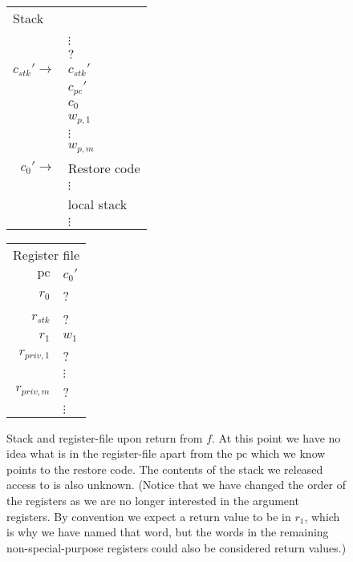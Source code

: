 \documentclass[a4paper]{article}
\newcommand{\var}[1]{\mathit{#1}}
\newcommand{\pc}{\mathit{pc}}
\newcommand{\pcreg}{\mathrm{pc}}
\begin{document}
\begin{figure}
  \label{fig:stack-upon-return}
  \centering
  \begin{tabular}[!h]{r | >{\raggedright\arraybackslash}p{3cm} |}
    \multicolumn{2}{l}{Stack} \\
    \cline{2-2}
 & \\
 & $\vdots$\\
    \cline{2-2} 
 & $?$\\
    \cline{2-2} 
    $c_{\var{stk}}' \rightarrow$  & $c_{\var{stk}}'$ \\
    \cline{2-2}
 & $c_\pc'$ \\
    \cline{2-2}
 & $c_0$ \\
    \cline{2-2}
 & $w_{p,1}$ \\
    \cline{2-2}
 & $\vdots$ \\
    \cline{2-2}
 & $w_{p,m}$ \\
    \cline{2-2}
    $c_0' \rightarrow$   & Restore code \\
 & $\vdots$\\
    \cline{2-2}
 & local stack\\
 & $\vdots$\\
    \cline{2-2}
  \end{tabular}
  \hspace{1cm}
  \begin{tabular}{r | >{\centering\arraybackslash}p{0.75cm} |}
    \multicolumn{2}{r}{Register file} \\
    \cline{2-2}
    $\pcreg$ & $c_0'$\\
    \cline{2-2}
    $r_0$  &  ? \\
    \cline{2-2}
    $r_{\var{stk}}$  & ? \\
    \cline{2-2}
    $r_1$ & $w_1$ \\
    \cline{2-2}
    $r_{\var{priv},1}$ & ?\\
    \cline{2-2}
             & $\vdots$ \\
    \cline{2-2}
    $r_{\var{priv},m}$ & ? \\
    \cline{2-2}
             & $\vdots$ \\
    \cline{2-2}
  \end{tabular}
  \caption{ Stack and register-file upon return from $f$. At this point we have no idea what is in the register-file apart from the $\pcreg$ which we know points to the restore code. The contents of the stack we released access to is also unknown. (Notice that we have changed the order of the registers as we are no longer interested in the argument registers. By convention we expect a return value to be in $r_1$, which is why we have named that word, but the words in the remaining non-special-purpose registers could also be considered return values.)}
\end{figure}
\end{document}
